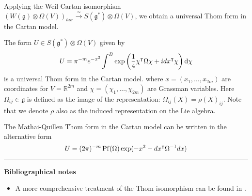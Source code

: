  
Applying the Weil-Cartan isomorphism $(W(\mathfrak{g})\otimes \Omega(V))_{hor}
\xrightarrow{\simeq} S(\mathfrak{g}^*)\otimes \Omega(V)$, we obtain a universal Thom form in the
Cartan model. 
\begin{prop}
	The form $U\in S(\mathfrak{g}^*)\otimes \Omega(V)$ given by 
	\[ %
	U = \pi^{-m}e^{-x^2} \int^B \exp \paren{\frac{1}{4}\chi^{\intercal}\Omega\chi +
	idx^{\intercal}\chi} \odif{\chi} 
	\]
	is a universal Thom form in the Cartan model.
	where $x=(x_1,\ldots,x_{2m})$ are coordinates for $V=\mathbb{R}^{2m}$ and
	$\chi=(\chi_1,\ldots,\chi_{2m})$ are Grassman variables. Here $\Omega_{ij} \in
	\mathfrak{g}$ is defined as the image of the representation: $\Omega_{ij}(X) =
	\rho(X)_{ij}$. Note that we denote $\rho$ also as the induced representation on
	the Lie algebra.
\end{prop}
 
 

	The Mathai-Quillen Thom form in the Cartan model can be written in the
	alternative form
	\[%
	U = (2\pi)^{-m} \Pf(\Omega) \exp(-x^2-dx^{\intercal}\Omega^{-1}dx)
	\] 



\vspace{5mm}
\hrule 
\vspace{5mm}

\textbf{Bibliographical notes}
{\small
\begin{itemize}
	\item A more comprehensive treatment of the Thom isomorphism can be found in
		\citet{bott_tu}.  
\end{itemize}
}
